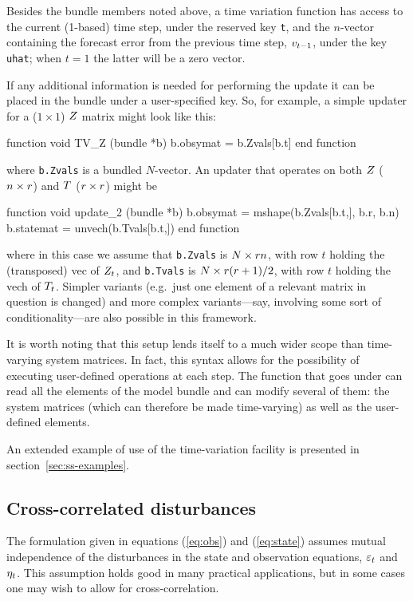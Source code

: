 Besides the bundle members noted above, a time variation function has
access to the current (1-based) time step, under the reserved key
\texttt{t}, and the $n$-vector containing the forecast error from the
previous time step, $v_{t-1}$, under the key \texttt{uhat};
when $t=1$ the latter will be a zero vector.

If any additional information is needed for performing the update it
can be placed in the bundle under a user-specified key.  So, for
example, a simple updater for a ($1 \times 1$) $Z$ matrix might
look like this:
%
\begin{code}
function void TV_Z (bundle *b)
    b.obsymat = b.Zvals[b.t]
end function
\end{code}
%
where \texttt{b.Zvals} is a bundled $N$-vector. An updater that
operates on both $Z$ ($n \times r$) and $T$
($r \times r$) might be
%
\begin{code}
function void update_2 (bundle *b)
    b.obsymat = mshape(b.Zvals[b.t,], b.r, b.n)
    b.statemat = unvech(b.Tvals[b.t,])
end function
\end{code}
%
where in this case we assume that \texttt{b.Zvals} is
$N \times rn$, with row $t$ holding the (transposed) vec of
$Z_t$, and \texttt{b.Tvals} is $N \times r(r +1)/2$,
with row $t$ holding the vech of $T_t$. Simpler variants
(e.g.\ just one element of a relevant matrix in question is changed)
and more complex variants---say, involving some sort of
conditionality---are also possible in this framework.

It is worth noting that this setup lends itself to a much wider scope
than time-varying system matrices. In fact, this syntax allows for the
possibility of executing user-defined operations at each step. The
function that goes under  can read all the
elements of the model bundle and can modify several of them: the
system matrices (which can therefore be made time-varying) as well as
the user-defined elements.

An extended example of use of the time-variation facility is presented
in section~\ref{sec:ss-examples}.

\subsection{Cross-correlated disturbances}
\label{sec:crossd}

The formulation given in equations (\ref{eq:obs}) and (\ref{eq:state})
assumes mutual independence of the disturbances in the state and
observation equations, $\varepsilon_t$ and $\eta_t$.  This assumption
holds good in many practical applications, but in some cases one may
wish to allow for cross-correlation.

